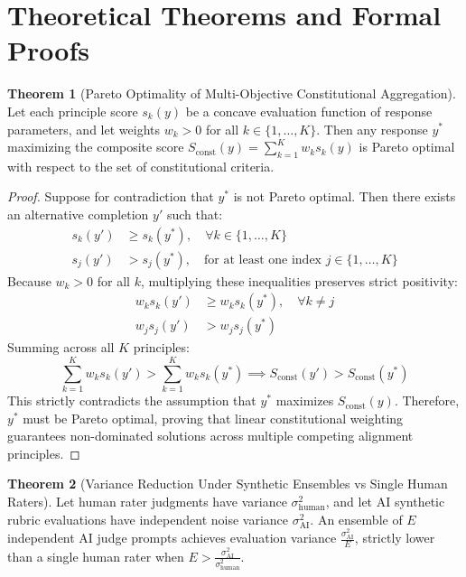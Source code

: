 \documentclass[11pt,a4paper]{article}
\theoremstyle{definition}
\newtheorem{theorem}{\textbf{Theorem}}[section]
\begin{document}
\section{Theoretical Theorems and Formal Proofs}

\begin{theorem}[Pareto Optimality of Multi-Objective Constitutional Aggregation]
Let each principle score $s_k(y)$ be a concave evaluation function of response parameters, and let weights $w_k > 0$ for all $k \in \{1, \dots, K\}$. Then any response $y^*$ maximizing the composite score $S_{\text{const}}(y) = \sum_{k=1}^K w_k s_k(y)$ is Pareto optimal with respect to the set of constitutional criteria.
\end{theorem}

\begin{proof}
Suppose for contradiction that $y^*$ is not Pareto optimal.
Then there exists an alternative completion $y'$ such that:
{\boldmath
\begin{align}
s_k(y') &\ge s_k(y^*), \quad \forall k \in \{1, \dots, K\} \\
s_j(y') &> s_j(y^*), \quad \text{for at least one index } j \in \{1, \dots, K\}
\end{align}
}
Because $w_k > 0$ for all $k$, multiplying these inequalities preserves strict positivity:
{\boldmath
\begin{align}
w_k s_k(y') &\ge w_k s_k(y^*), \quad \forall k \ne j \\
w_j s_j(y') &> w_j s_j(y^*)
\end{align}
}
Summing across all $K$ principles:
{\boldmath
\begin{equation}
\sum_{k=1}^K w_k s_k(y') > \sum_{k=1}^K w_k s_k(y^*) \implies S_{\text{const}}(y') > S_{\text{const}}(y^*)
\end{equation}
}
This strictly contradicts the assumption that $y^*$ maximizes $S_{\text{const}}(y)$.
Therefore, $y^*$ must be Pareto optimal, proving that linear constitutional weighting guarantees non-dominated solutions across multiple competing alignment principles.
\end{proof}

\begin{theorem}[Variance Reduction Under Synthetic Ensembles vs Single Human Raters]
Let human rater judgments have variance $\sigma_{\text{human}}^2$, and let AI synthetic rubric evaluations have independent noise variance $\sigma_{\text{AI}}^2$. An ensemble of $E$ independent AI judge prompts achieves evaluation variance $\frac{\sigma_{\text{AI}}^2}{E}$, strictly lower than a single human rater when $E > \frac{\sigma_{\text{AI}}^2}{\sigma_{\text{human}}^2}$.
\end{theorem}
\end{document}
